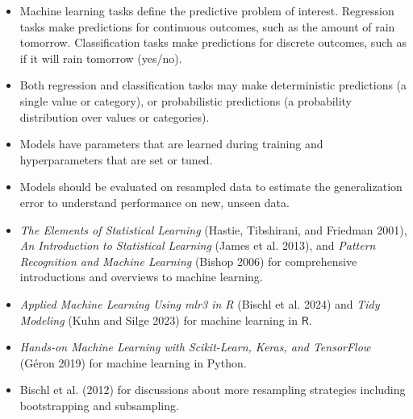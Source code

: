 \documentclass[
  letterpaper,
  krantz2]{style/krantz}
\providecommand{\tightlist}{%
  \setlength{\itemsep}{0pt}\setlength{\parskip}{0pt}}
\begin{document}
\begin{tcolorbox}[enhanced jigsaw, toprule=.15mm, bottomtitle=1mm, opacityback=0, breakable, leftrule=.75mm, title={Key takeaways}, toptitle=1mm, bottomrule=.15mm, colback=white, colframe=quarto-callout-warning-color-frame, titlerule=0mm, opacitybacktitle=0.6, coltitle=black, rightrule=.15mm, left=2mm, colbacktitle=quarto-callout-warning-color!10!white, arc=.35mm]

\begin{itemize}
\tightlist
\item
  Machine learning tasks define the predictive problem of interest.
  Regression tasks make predictions for continuous outcomes, such as the
  amount of rain tomorrow. Classification tasks make predictions for
  discrete outcomes, such as if it will rain tomorrow (yes/no).
\item
  Both regression and classification tasks may make deterministic
  predictions (a single value or category), or probabilistic predictions
  (a probability distribution over values or categories).
\item
  Models have parameters that are learned during training and
  hyperparameters that are set or tuned.
\item
  Models should be evaluated on resampled data to estimate the
  generalization error to understand performance on new, unseen data.
\end{itemize}

\end{tcolorbox}

\begin{tcolorbox}[enhanced jigsaw, toprule=.15mm, bottomtitle=1mm, opacityback=0, breakable, leftrule=.75mm, title={Further reading}, toptitle=1mm, bottomrule=.15mm, colback=white, colframe=quarto-callout-tip-color-frame, titlerule=0mm, opacitybacktitle=0.6, coltitle=black, rightrule=.15mm, left=2mm, colbacktitle=quarto-callout-tip-color!10!white, arc=.35mm]

\begin{itemize}
\tightlist
\item
  \emph{The Elements of Statistical Learning} (Hastie, Tibshirani, and
  Friedman 2001), \emph{An Introduction to Statistical Learning} (James
  et al. 2013), and \emph{Pattern Recognition and Machine Learning}
  (Bishop 2006) for comprehensive introductions and overviews to machine
  learning.
\item
  \emph{Applied Machine Learning Using mlr3 in R} (Bischl et al. 2024)
  and \emph{Tidy Modeling} (Kuhn and Silge 2023) for machine learning in
  \(\textsf{R}\).
\item
  \emph{Hands-on Machine Learning with Scikit-Learn, Keras, and
  TensorFlow} (Géron 2019) for machine learning in Python.
\item
  Bischl et al. (2012) for discussions about more resampling strategies
  including bootstrapping and subsampling.
\end{itemize}

\end{tcolorbox}
\end{document}
